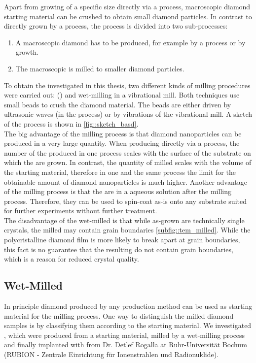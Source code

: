 	Apart from growing \nds of a specific size directly via a \CVD process, macroscopic diamond starting material can be crushed to obtain small diamond particles.
	In contrast to \nds directly grown by a \CVD process, the process is divided into two sub-processes:

	\begin{enumerate}
		\item A macroscopic diamond has to be produced, for example by a \HPHT process or by \CVD growth.
		\item The macroscopic is milled to smaller diamond particles.
	\end{enumerate}

	To obtain the \nds investigated in this thesis, two different kinds of milling procedures were carried out: \basd (\BASD) and wet-milling in a vibrational mill.
	Both techniques use small beads to crush the diamond material. 
	The beads are either driven by ultrasonic waves (in the \BASD process) or by vibrations of the vibrational mill.
	A sketch of the process is shown in \autoref{fig::sketch_basd}.
	\\
	The big advantage of the milling process is that diamond nanoparticles can be produced in a very large quantity.
	When producing \nds directly via a \CVD process, the number of the produced \nds in one process scales with the surface of the substrate on which the \nds are grown.
	In contrast, the quantity of milled \nds scales with the volume of the starting material, therefore in one and the same process the limit for the obtainable amount of diamond nanoparticles is much higher.
	Another advantage of the milling process is that the \nds are in a aqueous solution after the milling process.
	Therefore, they can be used to spin-coat as-is onto any substrate suited for further experiments without further treatment.
	\\
	The disadvantage of the wet-milled \nds is that while as-grown \CVD \nds are technically single crystals, the milled \nds may contain grain boundaries \autoref{subfig::tem_milled}.
	While the polycristalline diamond film is more likely to break apart at grain boundaries, this fact is no guarantee that the resulting \nds do not contain grain boundaries, which is a reason for reduced crystal quality.
	\\
	\subsection{Wet-Milled \HPHT \Nds}\label{subsec::hpht_nds}
	In principle diamond produced by any production method can be used as starting material for the milling process.
	One way to distinguish the milled diamond samples is by classifying them according to the starting material.
	We investigated \nds, which were produced from a \HPHT starting material, milled by a wet-milling process and finally implanted with   from Dr. Detlef Rogalla at Ruhr-Universität Bochum (RUBION - Zentrale Einrichtung für Ionenstrahlen und Radionuklide).
	\\
